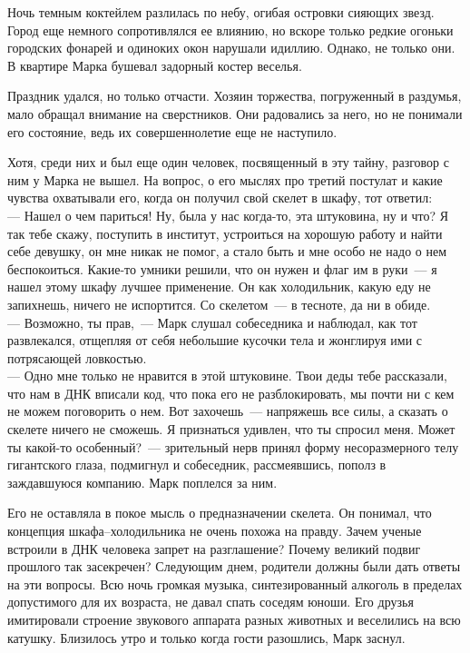 
Ночь темным коктейлем разлилась по небу, огибая островки сияющих звезд. Город 
еще немного сопротивлялся ее влиянию, но вскоре только редкие огоньки городских 
фонарей и одиноких окон нарушали идиллию. Однако, не только они. В квартире 
Марка бушевал задорный костер веселья.

Праздник удался, но только отчасти. Хозяин торжества, погруженный в раздумья, 
мало обращал внимание на сверстников. Они радовались за него, но не понимали 
его состояние, ведь их совершеннолетие еще не наступило.

Хотя, среди них и был еще один человек, посвященный в эту тайну, разговор с ним 
у Марка не вышел. На вопрос, о его мыслях про третий постулат и какие чувства 
охватывали его, когда он получил свой скелет в шкафу, тот ответил:\\
--- Нашел о чем париться! Ну, была у нас когда-то, эта штуковина, ну и что? Я 
так тебе скажу, поступить в институт, устроиться на хорошую работу и найти себе 
девушку, он мне никак не помог, а стало быть и мне особо не надо о нем 
беспокоиться. Какие-то умники решили, что он нужен и флаг им в руки~--- я нашел 
этому шкафу лучшее применение. Он как холодильник, какую еду не запихнешь, 
ничего не испортится. Со скелетом~--- в тесноте, да ни в обиде.\\
--- Возможно, ты прав,~--- Марк слушал собеседника и наблюдал, как тот 
развлекался, отщепляя от себя небольшие кусочки тела и жонглируя ими с 
потрясающей ловкостью.\\
--- Одно мне только не нравится в этой штуковине. Твои деды тебе рассказали, 
что нам в ДНК вписали код, что пока его не разблокировать, мы почти ни с кем не 
можем поговорить о нем. Вот захочешь~--- напряжешь все силы, а сказать о 
скелете ничего не сможешь. Я признаться удивлен, что ты спросил меня. Может ты 
какой-то особенный?~--- зрительный нерв принял форму несоразмерного телу 
гигантского глаза, подмигнул и собеседник, рассмеявшись, пополз в заждавшуюся 
компанию. Марк поплелся за ним.

Его не оставляла в покое мысль о предназначении скелета. Он понимал, что 
концепция шкафа--холодильника не очень похожа на правду. Зачем ученые встроили 
в ДНК человека запрет на разглашение? Почему великий подвиг прошлого так 
засекречен? Следующим днем, родители должны были дать ответы на эти вопросы.
Всю ночь громкая музыка, синтезированный алкоголь в пределах допустимого для их 
возраста, не давал спать соседям юноши. Его друзья имитировали строение 
звукового аппарата разных животных и веселились на всю катушку. Близилось утро 
и только когда гости разошлись, Марк заснул.

